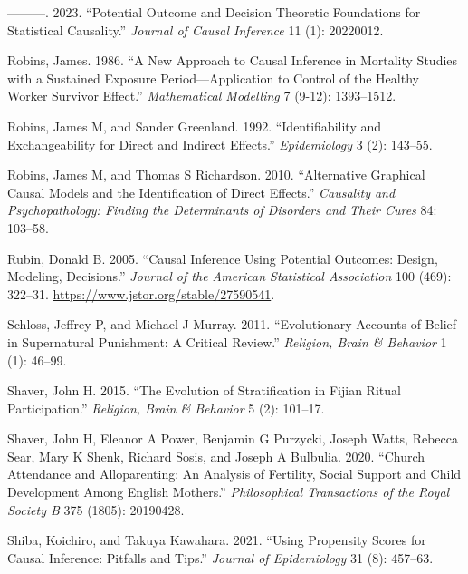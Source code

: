 \documentclass[
  single column]{article}
\newlength{\cslhangindent}
\newenvironment{CSLReferences}[2] %
 {\begin{list}{}{%
  \setlength{\itemindent}{0pt}
  \setlength{\leftmargin}{0pt}
  \setlength{\parsep}{0pt}
  \ifodd #1
   \setlength{\leftmargin}{\cslhangindent}
   \setlength{\itemindent}{-1\cslhangindent}
  \fi
  \setlength{\itemsep}{#2\baselineskip}}}
 {\end{list}}
\begin{document}
\begin{CSLReferences}{1}{0}
---------. 2023. {``Potential Outcome and Decision Theoretic Foundations
for Statistical Causality.''} \emph{Journal of Causal Inference} 11 (1):
20220012.

Robins, James. 1986. {``A New Approach to Causal Inference in Mortality
Studies with a Sustained Exposure Period---Application to Control of the
Healthy Worker Survivor Effect.''} \emph{Mathematical Modelling} 7
(9-12): 1393--1512.

Robins, James M, and Sander Greenland. 1992. {``Identifiability and
Exchangeability for Direct and Indirect Effects.''} \emph{Epidemiology}
3 (2): 143--55.

Robins, James M, and Thomas S Richardson. 2010. {``Alternative Graphical
Causal Models and the Identification of Direct Effects.''}
\emph{Causality and Psychopathology: Finding the Determinants of
Disorders and Their Cures} 84: 103--58.

Rubin, Donald B. 2005. {``Causal Inference Using Potential Outcomes:
Design, Modeling, Decisions.''} \emph{Journal of the American
Statistical Association} 100 (469): 322--31.
\url{https://www.jstor.org/stable/27590541}.

Schloss, Jeffrey P, and Michael J Murray. 2011. {``Evolutionary Accounts
of Belief in Supernatural Punishment: A Critical Review.''}
\emph{Religion, Brain \& Behavior} 1 (1): 46--99.

Shaver, John H. 2015. {``The Evolution of Stratification in Fijian
Ritual Participation.''} \emph{Religion, Brain \& Behavior} 5 (2):
101--17.

Shaver, John H, Eleanor A Power, Benjamin G Purzycki, Joseph Watts,
Rebecca Sear, Mary K Shenk, Richard Sosis, and Joseph A Bulbulia. 2020.
{``Church Attendance and Alloparenting: An Analysis of Fertility, Social
Support and Child Development Among {E}nglish Mothers.''}
\emph{Philosophical Transactions of the Royal Society B} 375 (1805):
20190428.

Shiba, Koichiro, and Takuya Kawahara. 2021. {``Using Propensity Scores
for Causal Inference: Pitfalls and Tips.''} \emph{Journal of
Epidemiology} 31 (8): 457--63.


\end{CSLReferences}
\end{document}
